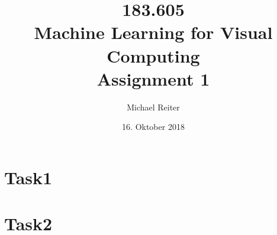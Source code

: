 \documentclass[a4]{article}
\title{\bf 183.605 \\ Machine Learning for Visual Computing \\ Assignment 1}
\author{Michael Reiter}
\date{16. Oktober 2018}
\begin{document}
\maketitle
\noindent

\section{Task1}


\section{Task2}

\end{document}

